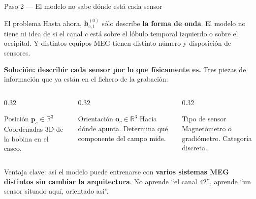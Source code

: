 \documentclass[aspectratio=169,10pt]{beamer}
\newcommand{\term}[1]{\textbf{\color{deepgreen}#1}}
\begin{document}
\begin{frame}[c]{Paso 2 --- El modelo no sabe dónde está cada sensor}
  \small
  \begin{alertblock}{El problema}
    Hasta ahora, $\mathbf{h}^{(0)}_{c,t}$ sólo describe \term{la forma de onda}. El modelo no tiene ni idea de si el canal $c$ está sobre el lóbulo temporal izquierdo o sobre el occipital. Y distintos equipos MEG tienen distinto número y disposición de sensores.
  \end{alertblock}
  \vspace{2mm}
  \textbf{Solución: describir cada sensor por lo que físicamente es.} Tres piezas de información que ya están en el fichero de la grabación:
  \begin{columns}[t,totalwidth=\linewidth]
    \begin{column}{0.32\linewidth}
      \begin{block}{Posición $\mathbf{p}_c \in \mathbb{R}^3$}
        \scriptsize Coordenadas 3D de la bobina en el casco.
      \end{block}
    \end{column}
    \begin{column}{0.32\linewidth}
      \begin{block}{Orientación $\mathbf{o}_c \in \mathbb{R}^3$}
        \scriptsize Hacia dónde apunta. Determina qué componente del campo mide.
      \end{block}
    \end{column}
    \begin{column}{0.32\linewidth}
      \begin{block}{Tipo de sensor}
        \scriptsize Magnetómetro o gradiómetro. Categoría discreta.
      \end{block}
    \end{column}
  \end{columns}
  \vspace{2mm}
  \centering\small
  Ventaja clave: así el modelo puede entrenarse con \term{varios sistemas MEG distintos sin cambiar la arquitectura}. No aprende ``el canal 42'', aprende ``un sensor situado aquí, orientado así''.
\end{frame}
\end{document}
